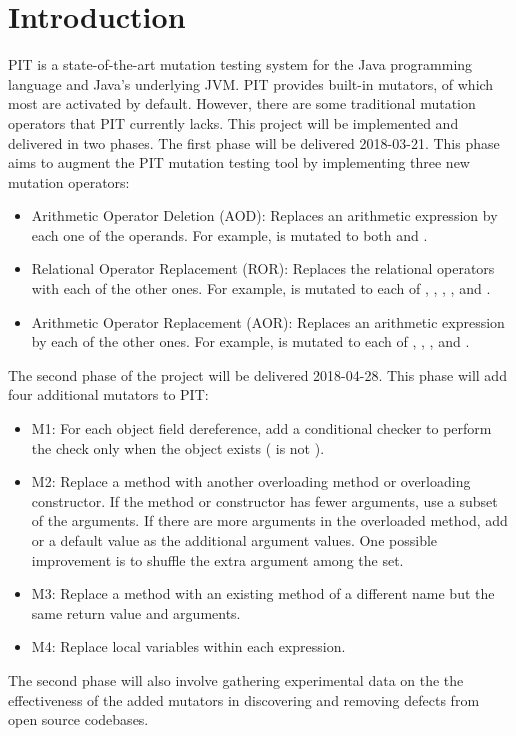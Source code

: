 \section{Introduction}

PIT is a state-of-the-art mutation testing system for the Java programming language and Java’s underlying JVM.
PIT provides built-in mutators, of which most are activated by default.
However, there are some traditional mutation operators that PIT currently lacks.
This project will be implemented and delivered in two phases.
The first phase will be delivered 2018-03-21.
This phase aims to augment the PIT mutation testing tool by implementing three new mutation operators:
\begin{itemize}
\item
  Arithmetic Operator Deletion (AOD):
  Replaces an arithmetic expression by each one of the operands.
  For example,  is mutated to both  and .
\item
  Relational Operator Replacement (ROR):
  Replaces the relational operators with each of the other ones.
  For example, \java{<} is mutated to each of \java{>}, \java{>=}, \java{==}, \java{<=}, and \java{!=}.
\item
  Arithmetic Operator Replacement (AOR):
  Replaces an arithmetic expression by each of the other ones.
  For example,  is mutated to each of , , , and .
\end{itemize}

The second phase of the project will be delivered 2018-04-28.  This phase will add four additional mutators to PIT:
\begin{itemize}
\item
  M1:
  For each object field dereference, add a conditional checker to perform the check only when the object exists (\ie{} is not ).
\item
  M2:
  Replace a method with another overloading method or overloading constructor.
  If the method or constructor has fewer arguments, use a subset of the arguments.
  If there are more arguments in the overloaded method, add  or a default value as the additional argument values.
  One possible improvement is to shuffle the extra argument among the set.
\item
  M3:
  Replace a method with an existing method of a different name but the same return value and arguments.
\item
  M4:
  Replace local variables within each expression.
\end{itemize}

The second phase will also involve gathering experimental data on the the effectiveness of the added mutators in discovering and removing defects from open source codebases.
